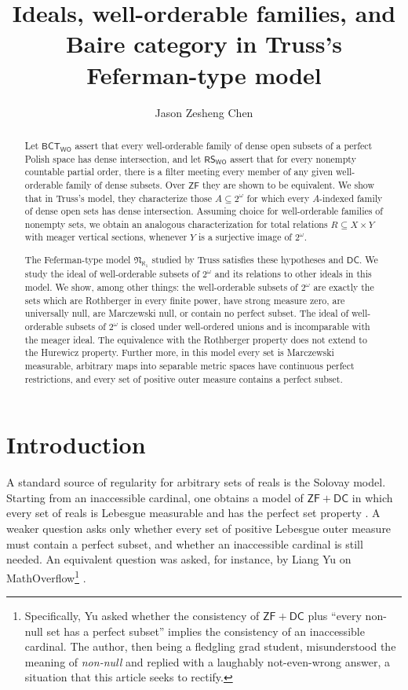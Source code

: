 \documentclass[11pt,reqno]{amsart}
\title[Baire Category in Truss Model]
{Ideals, well-orderable families, and Baire category in Truss's Feferman-type model}
\author{Jason Zesheng Chen}
\newcommand{\WO}{\mathsf{WO}}
\newcommand{\BCTWO}{\mathsf{BCT}_{\WO}}
\newcommand{\RSWO}{\mathsf{RS}_{\WO}}
\theoremstyle{plain}
\theoremstyle{definition}
\theoremstyle{remark}
\begin{document}
\begin{abstract}
Let $\BCTWO$ assert that every well-orderable family of dense open subsets
of a perfect Polish space has dense intersection, and let $\RSWO$ assert that for every nonempty countable partial order,
there is a filter meeting every member of any given well-orderable family of dense subsets.  Over $\mathsf{ZF}$ they are shown to be equivalent. We show that in Truss's model, they characterize those $A\subseteq2^\omega$ for
which every $A$-indexed family of dense open sets has dense intersection.
Assuming choice for well-orderable families of nonempty sets, we obtain an analogous characterization for total relations $R\subseteq X\times Y$ with meager vertical sections, whenever $Y$ is a surjective image of $2^\omega$.

The Feferman-type model $\mathfrak N_{\aleph_1}$ studied by Truss \cite{Truss1974} satisfies these hypotheses and $\mathsf{DC}$.
We study the ideal of well-orderable subsets of $2^\omega$ and its relations to other ideals in this model. We show, among other things: the well-orderable subsets of $2^\omega$ are exactly the sets which are
Rothberger in every finite power, have strong measure zero, are universally
null, are Marczewski null, or contain no perfect subset. The ideal of well-orderable subsets of $2^\omega$ is closed under
well-ordered unions and is incomparable with the meager ideal.  The
equivalence with the Rothberger property does not extend to the Hurewicz property.  Further more, in this model every set is Marczewski measurable, arbitrary maps into separable metric spaces have continuous perfect restrictions, and every set of positive outer measure contains a perfect subset.
\end{abstract}

\maketitle

\section{Introduction}\label{sec:intro}

A standard source of regularity for arbitrary sets of reals is the Solovay
model.  Starting from an inaccessible cardinal, one obtains a model of
$\mathsf{ZF}+\mathsf{DC}$ in which every set of reals is Lebesgue measurable
and has the perfect set property \cite{Solovay1970}.  A weaker question asks only whether every set of positive Lebesgue outer
measure must contain a perfect subset, and whether an inaccessible cardinal
is still needed.  An equivalent question was asked, for instance, by Liang Yu on MathOverflow\footnote{Specifically, Yu asked whether the consistency of $\mathsf{ZF}+\mathsf{DC}$ plus ``every non-null set has a perfect subset'' implies the consistency of an inaccessible cardinal. The author, then being a fledgling grad student, misunderstood the meaning of \textit{non-null} and replied with a laughably not-even-wrong answer, a situation that this article seeks to rectify.}
\cite{YuMO2021}.
\end{document}
